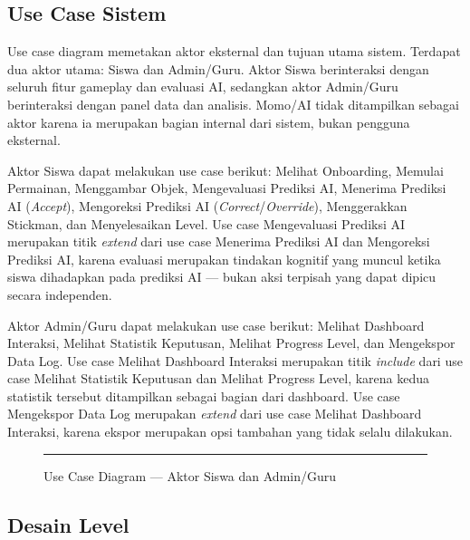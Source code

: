 \documentclass[12pt,oneside]{report}
\begin{document}
\subsection{Use Case Sistem}
\label{subsec:use-case}

Use case diagram memetakan aktor eksternal dan tujuan utama sistem. Terdapat dua aktor utama: Siswa dan Admin/Guru. Aktor Siswa berinteraksi dengan seluruh fitur gameplay dan evaluasi AI, sedangkan aktor Admin/Guru berinteraksi dengan panel data dan analisis. Momo/AI tidak ditampilkan sebagai aktor karena ia merupakan bagian internal dari sistem, bukan pengguna eksternal.

Aktor Siswa dapat melakukan use case berikut: Melihat Onboarding, Memulai Permainan, Menggambar Objek, Mengevaluasi Prediksi AI, Menerima Prediksi AI (\textit{Accept}), Mengoreksi Prediksi AI (\textit{Correct}/\textit{Override}), Menggerakkan Stickman, dan Menyelesaikan Level. Use case Mengevaluasi Prediksi AI merupakan titik \textit{extend} dari use case Menerima Prediksi AI dan Mengoreksi Prediksi AI, karena evaluasi merupakan tindakan kognitif yang muncul ketika siswa dihadapkan pada prediksi AI --- bukan aksi terpisah yang dapat dipicu secara independen.

Aktor Admin/Guru dapat melakukan use case berikut: Melihat Dashboard Interaksi, Melihat Statistik Keputusan, Melihat Progress Level, dan Mengekspor Data Log. Use case Melihat Dashboard Interaksi merupakan titik \textit{include} dari use case Melihat Statistik Keputusan dan Melihat Progress Level, karena kedua statistik tersebut ditampilkan sebagai bagian dari dashboard. Use case Mengekspor Data Log merupakan \textit{extend} dari use case Melihat Dashboard Interaksi, karena ekspor merupakan opsi tambahan yang tidak selalu dilakukan.

\begin{figure}[H]
    \centering
    \rule{0.9\textwidth}{6cm}
    \caption{Use Case Diagram --- Aktor Siswa dan Admin/Guru}
    \label{fig:use-case}
\end{figure}


\subsection{Desain Level}
\label{subsec:desain-level}
\end{document}
